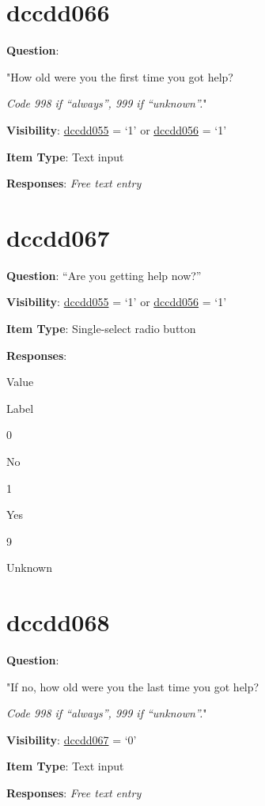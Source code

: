 \documentclass[]{book}
\begin{document}
\hypertarget{dccdd066}{%
\section{dccdd066}\label{dccdd066}}

\textbf{Question}:

"How old were you the first time you got help?

\emph{Code 998 if ``always'', 999 if ``unknown''.}"

\textbf{Visibility}: \protect\hyperlink{dccdd055}{dccdd055} = `1' or \protect\hyperlink{dccdd056}{dccdd056} = `1'

\textbf{Item Type}: Text input

\textbf{Responses}: \emph{Free text entry}

\hypertarget{dccdd067}{%
\section{dccdd067}\label{dccdd067}}

\textbf{Question}: ``Are you getting help now?''

\textbf{Visibility}: \protect\hyperlink{dccdd055}{dccdd055} = `1' or \protect\hyperlink{dccdd056}{dccdd056} = `1'

\textbf{Item Type}: Single-select radio button

\textbf{Responses}:

Value

Label

0

No

1

Yes

9

Unknown

\hypertarget{dccdd068}{%
\section{dccdd068}\label{dccdd068}}

\textbf{Question}:

"If no, how old were you the last time you got help?

\emph{Code 998 if ``always'', 999 if ``unknown''.}"

\textbf{Visibility}: \protect\hyperlink{dccdd067}{dccdd067} = `0'

\textbf{Item Type}: Text input

\textbf{Responses}: \emph{Free text entry}
\end{document}
